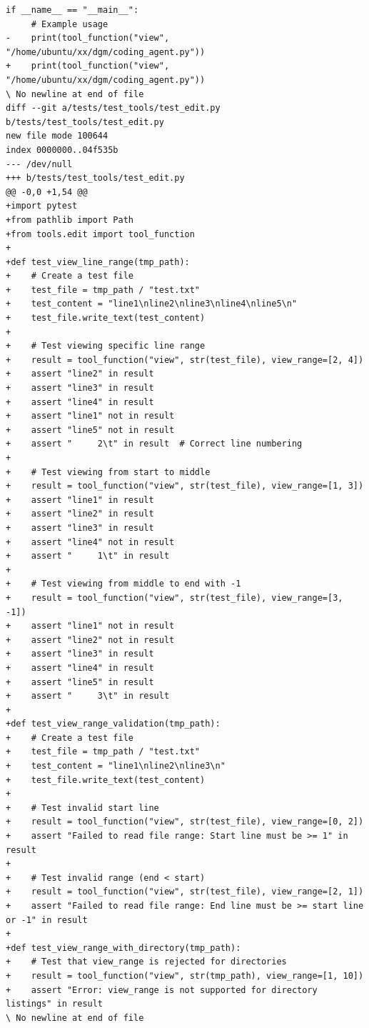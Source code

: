 \documentclass{article} %
\begin{document}
\begin{lstlisting}[style=diffstyle]
 if __name__ == "__main__":
     # Example usage
-    print(tool_function("view", "/home/ubuntu/xx/dgm/coding_agent.py"))
+    print(tool_function("view", "/home/ubuntu/xx/dgm/coding_agent.py"))
\ No newline at end of file
diff --git a/tests/test_tools/test_edit.py b/tests/test_tools/test_edit.py
new file mode 100644
index 0000000..04f535b
--- /dev/null
+++ b/tests/test_tools/test_edit.py
@@ -0,0 +1,54 @@
+import pytest
+from pathlib import Path
+from tools.edit import tool_function
+
+def test_view_line_range(tmp_path):
+    # Create a test file
+    test_file = tmp_path / "test.txt"
+    test_content = "line1\nline2\nline3\nline4\nline5\n"
+    test_file.write_text(test_content)
+
+    # Test viewing specific line range
+    result = tool_function("view", str(test_file), view_range=[2, 4])
+    assert "line2" in result
+    assert "line3" in result
+    assert "line4" in result
+    assert "line1" not in result
+    assert "line5" not in result
+    assert "     2\t" in result  # Correct line numbering
+
+    # Test viewing from start to middle
+    result = tool_function("view", str(test_file), view_range=[1, 3])
+    assert "line1" in result
+    assert "line2" in result
+    assert "line3" in result
+    assert "line4" not in result
+    assert "     1\t" in result
+
+    # Test viewing from middle to end with -1
+    result = tool_function("view", str(test_file), view_range=[3, -1])
+    assert "line1" not in result
+    assert "line2" not in result
+    assert "line3" in result
+    assert "line4" in result
+    assert "line5" in result
+    assert "     3\t" in result
+
+def test_view_range_validation(tmp_path):
+    # Create a test file
+    test_file = tmp_path / "test.txt"
+    test_content = "line1\nline2\nline3\n"
+    test_file.write_text(test_content)
+
+    # Test invalid start line
+    result = tool_function("view", str(test_file), view_range=[0, 2])
+    assert "Failed to read file range: Start line must be >= 1" in result
+
+    # Test invalid range (end < start)
+    result = tool_function("view", str(test_file), view_range=[2, 1])
+    assert "Failed to read file range: End line must be >= start line or -1" in result
+
+def test_view_range_with_directory(tmp_path):
+    # Test that view_range is rejected for directories
+    result = tool_function("view", str(tmp_path), view_range=[1, 10])
+    assert "Error: view_range is not supported for directory listings" in result
\ No newline at end of file
\end{lstlisting}

\end{document}
